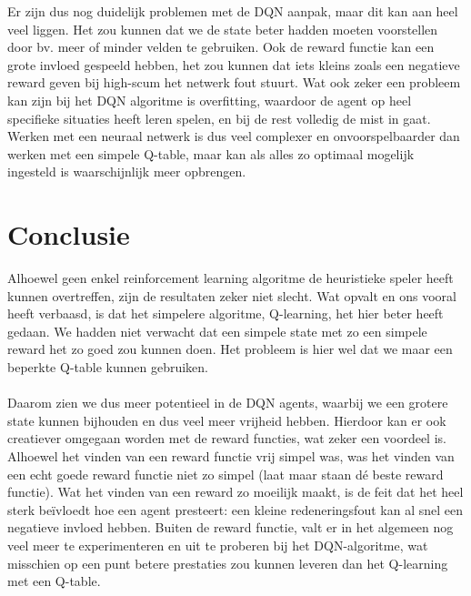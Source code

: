 \documentclass[11pt]{article}
\begin{document}
Er zijn dus nog duidelijk problemen met de DQN aanpak, maar dit kan aan heel veel liggen. Het zou kunnen dat we de state beter hadden moeten voorstellen door bv. meer of minder velden te gebruiken. Ook de reward functie kan een grote invloed gespeeld hebben, het zou kunnen dat iets kleins zoals een negatieve reward geven bij high-scum het netwerk fout stuurt. Wat ook zeker een probleem kan zijn bij het DQN algoritme is overfitting, waardoor de agent op heel specifieke situaties heeft leren spelen, en bij de rest volledig de mist in gaat. Werken met een neuraal netwerk is dus veel complexer en onvoorspelbaarder dan werken met een simpele Q-table, maar kan als alles zo optimaal mogelijk ingesteld is waarschijnlijk meer opbrengen.

\section{Conclusie}
Alhoewel geen enkel reinforcement learning algoritme de heuristieke speler heeft kunnen overtreffen, zijn de resultaten zeker niet slecht. Wat opvalt en ons vooral heeft verbaasd, is dat het simpelere algoritme, Q-learning, het hier beter heeft gedaan. We hadden niet verwacht dat een simpele state met zo een simpele reward het zo goed zou kunnen doen. Het probleem is hier wel dat we maar een beperkte Q-table kunnen gebruiken. \\\\
Daarom zien we dus meer potentieel in de DQN agents, waarbij we een grotere state kunnen bijhouden en dus veel meer vrijheid hebben. Hierdoor kan er ook creatiever omgegaan worden met de reward functies, wat zeker een voordeel is. Alhoewel het vinden van een reward functie vrij simpel was, was het vinden van een echt goede reward functie niet zo simpel (laat maar staan dé beste reward functie). Wat het vinden van een reward zo moeilijk maakt, is de feit dat het heel sterk beïvloedt hoe een agent presteert: een kleine redeneringsfout kan al snel een negatieve invloed hebben. Buiten de reward functie, valt er in het algemeen nog veel meer te experimenteren en uit te proberen bij het DQN-algoritme, wat misschien op een punt betere prestaties zou kunnen leveren dan het Q-learning met een Q-table. 
\newpage
\end{document}
